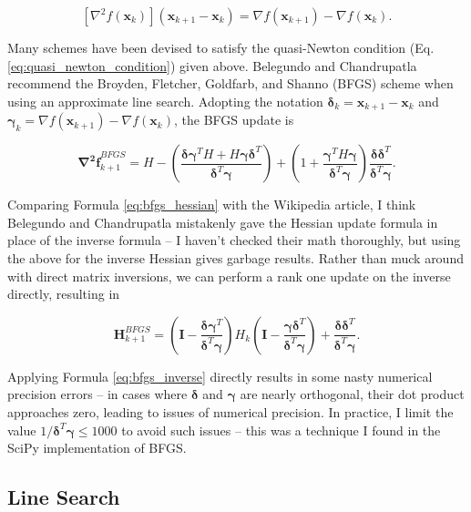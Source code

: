 \documentclass{article}
\newcommand{\bs}[1]{\boldsymbol{#1}}
\begin{document}
\begin{equation}
\left[\nabla^2 f(\bs{x}_k)\right](\bs{x}_{k+1}-\bs{x}_k) = \nabla f(\bs{x}_{k+1}) - \nabla f(\bs{x}_k). \label{eq:quasi_newton_condition}
\end{equation}

Many schemes have been devised to satisfy the quasi-Newton condition (Eq. \ref{eq:quasi_newton_condition}) given above. Belegundo and Chandrupatla recommend the Broyden, Fletcher, Goldfarb, and Shanno (BFGS) scheme when using an approximate line search. Adopting the notation $\bs{\delta}_k=\bs{x}_{k+1}-\bs{x}_k$ and $\bs{\gamma}_k=\nabla f(\bs{x}_{k+1}) - \nabla f(\bs{x}_k)$, the BFGS update is

\begin{equation}
\bs{\nabla^2 f}^{BFGS}_{k+1} = H - \left(\frac{\bs{\delta}\bs{\gamma}^TH+H\bs{\gamma}\bs{\delta}^T}{\bs{\delta}^T\bs{\gamma}}\right) + \left(1+\frac{\bs{\gamma}^TH\bs{\gamma}}{\bs{\delta}^T\bs{\gamma}}\right)\frac{\bs{\delta}\bs{\delta}^T}{\bs{\delta}^T\bs{\gamma}}. \label{eq:bfgs_hessian}
\end{equation}

Comparing Formula \ref{eq:bfgs_hessian} with the Wikipedia article, I think Belegundo and Chandrupatla mistakenly gave the Hessian update formula in place of the inverse formula -- I haven't checked their math thoroughly, but using the above for the inverse Hessian gives garbage results. Rather than muck around with direct matrix inversions, we can perform a rank one update on the inverse directly, resulting in

\begin{equation}
\bs{H}^{BFGS}_{k+1} = \left(\bs{I}-\frac{\bs{\delta}\bs{\gamma}^T}{\bs{\delta}^T\bs{\gamma}}\right)H_{k}\left(\bs{I}-\frac{\bs{\gamma}\bs{\delta}^T}{\bs{\delta}^T\bs{\gamma}}\right) + \frac{\bs{\delta}\bs{\delta}^T}{\bs{\delta}^T\bs{\gamma}}. \label{eq:bfgs_inverse}
\end{equation}

Applying Formula \ref{eq:bfgs_inverse} directly results in some nasty numerical precision errors -- in cases where $\bs{\delta}$ and $\bs{\gamma}$ are nearly orthogonal, their dot product approaches zero, leading to issues of numerical precision. In practice, I limit the value $1/\bs{\delta}^T\bs{\gamma}\leq 1000$ to avoid such issues -- this was a technique I found in the SciPy implementation of BFGS.

\subsection{Line Search}
\end{document}
